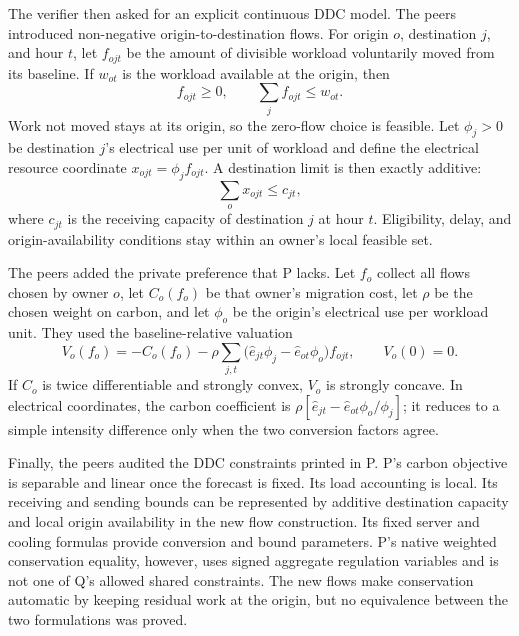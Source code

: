 \documentclass{article}
\begin{document}
The verifier then asked for an explicit continuous DDC model.  The peers introduced non-negative origin-to-destination flows.  For origin $o$, destination $j$, and hour $t$, let $f_{ojt}$ be the amount of divisible workload voluntarily moved from its baseline.  If $w_{ot}$ is the workload available at the origin, then
\begin{equation}
  f_{ojt}\geq 0,
  \qquad \sum_j f_{ojt}\leq w_{ot}.
  \label{eq:flow}
\end{equation}
Work not moved stays at its origin, so the zero-flow choice is feasible.  Let $\phi_j>0$ be destination $j$'s electrical use per unit of workload and define the electrical resource coordinate $x_{ojt}=\phi_j f_{ojt}$.  A destination limit is then exactly additive:
\begin{equation}
  \sum_o x_{ojt}\leq c_{jt},
  \label{eq:capacity}
\end{equation}
where $c_{jt}$ is the receiving capacity of destination $j$ at hour $t$.  Eligibility, delay, and origin-availability conditions stay within an owner's local feasible set.

The peers added the private preference that P lacks.  Let $f_o$ collect all flows chosen by owner $o$, let $C_o(f_o)$ be that owner's migration cost, let $\rho$ be the chosen weight on carbon, and let $\phi_o$ be the origin's electrical use per workload unit.  They used the baseline-relative valuation
\begin{equation}
  V_o(f_o)=-C_o(f_o)-\rho\sum_{j,t}
  \bigl(\widehat e_{jt}\phi_j-\widehat e_{ot}\phi_o\bigr)f_{ojt},
  \qquad V_o(0)=0.
  \label{eq:value}
\end{equation}
If $C_o$ is twice differentiable and strongly convex, $V_o$ is strongly concave.  In electrical coordinates, the carbon coefficient is
$\rho[\widehat e_{jt}-\widehat e_{ot}\phi_o/\phi_j]$; it reduces to a simple intensity difference only when the two conversion factors agree.

Finally, the peers audited the DDC constraints printed in P.  P's carbon objective is separable and linear once the forecast is fixed.  Its load accounting is local.  Its receiving and sending bounds can be represented by additive destination capacity and local origin availability in the new flow construction.  Its fixed server and cooling formulas provide conversion and bound parameters.  P's native weighted conservation equality, however, uses signed aggregate regulation variables and is not one of Q's allowed shared constraints.  The new flows make conservation automatic by keeping residual work at the origin, but no equivalence between the two formulations was proved.
\end{document}
